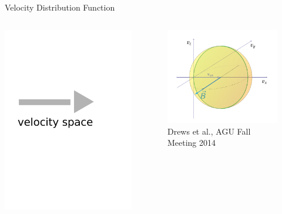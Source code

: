 \documentclass{beamer}
\begin{document}
\begin{frame}{Velocity Distribution Function}
\begin{columns}
		\includegraphics[scale=0.1]{pictures/arrow.pdf}
	\column{5cm}
		\begin{figure}
		\includegraphics[scale=0.25]{pictures/vdf_3d.png}
		\caption{\tiny{Drews et al., AGU Fall Meeting 2014}}
		\end{figure}
\end{columns}
\end{frame}
\end{document}
